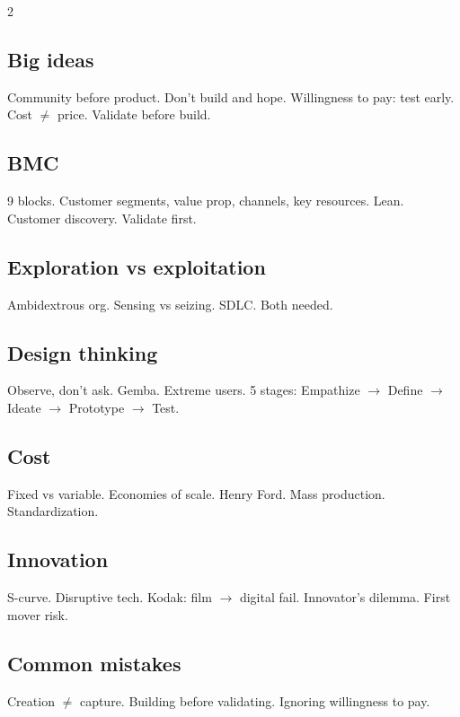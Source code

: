 \documentclass[10pt,landscape,a4paper]{article}
\begin{document}
\begin{multicols}{2}
\subsection*{\color{accent} Big ideas}
Community before product. Don't build and hope. Willingness to pay: test early. Cost $\neq$ price. Validate before build.

\subsection*{\color{accent} BMC}
9 blocks. Customer segments, value prop, channels, key resources. Lean. Customer discovery. Validate first.

\subsection*{\color{accent} Exploration vs exploitation}
Ambidextrous org. Sensing vs seizing. SDLC. Both needed.

\subsection*{\color{accent} Design thinking}
Observe, don't ask. Gemba. Extreme users. 5 stages: Empathize $\to$ Define $\to$ Ideate $\to$ Prototype $\to$ Test.

\subsection*{\color{accent} Cost}
Fixed vs variable. Economies of scale. Henry Ford. Mass production. Standardization.

\subsection*{\color{accent} Innovation}
S-curve. Disruptive tech. Kodak: film $\to$ digital fail. Innovator's dilemma. First mover risk.

\subsection*{\color{accent} Common mistakes}
Creation $\neq$ capture. Building before validating. Ignoring willingness to pay.
\end{multicols}
\end{document}
